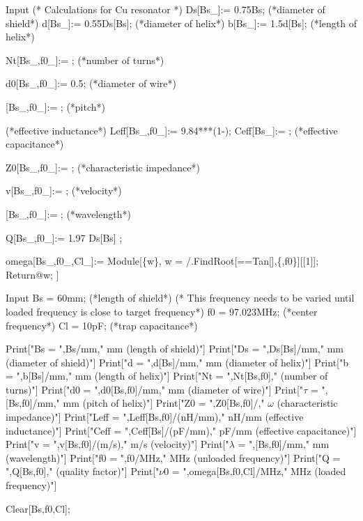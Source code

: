 \begin{mmaCell}[moredefined={Ds, d, b, Nt, d0, Leff, Ceff, Z0, v, Q, omega},morepattern={Bs_, Bs, f0_, f0, Cl_, Cl},morelocal={w}]{Input}
(* Calculations for Cu resonator *)
Ds[Bs_]:= 0.75Bs; (*diameter of shield*)
d[Bs_]:= 0.55Ds[Bs]; (*diameter of helix*)
b[Bs_]:= 1.5d[Bs]; (*length of helix*)

Nt[Bs_,f0_]:= ; (*number of turns*)

d0[Bs_,f0_]:= 0.5; (*diameter of wire*)

\mmaDef{\(\tau\)}[Bs_,f0_]:= ; (*pitch*)

(*effective inductance*)
Leff[Bs_,f0_]:= 9.84***(1-);
Ceff[Bs_]:= ; (*effective capacitance*)
  

Z0[Bs_,f0_]:= ; (*characteristic impedance*)

v[Bs_,f0_]:= ; (*velocity*)
  
\mmaDef{\(\lambda\)}[Bs_,f0_]:= ; (*wavelength*)

Q[Bs_,f0_]:= 1.97 Ds[Bs] ;

omega[Bs_,f0_,Cl_]:= Module[\{w\},
  w = \mmaUnd{\(\nu\)}/.FindRoot[==Tan[],\{\mmaFnc{\(\nu\)},f0\}][[1]];
  Return@w;
]
\end{mmaCell}

\begin{mmaCell}[moredefined={mm, MHz, pF, Ds, d, b, Nt, d0, Z0, Leff, nH, Ceff, v, m, s, Q, omega}]{Input}
Bs = 60mm; (*length of shield*)
(* This frequency needs to be varied 
until loaded frequency is close to target frequency*)
f0 = 97.023MHz; (*center frequency*)
Cl = 10pF; (*trap capacitance*)
  
Print["Bs = ",Bs/mm," mm (length of shield)"]
Print["Ds = ",Ds[Bs]/mm," mm (diameter of shield)"]
Print["d = ",d[Bs]/mm," mm (diameter of helix)"]
Print["b = ",b[Bs]/mm," mm (length of helix)"]
Print["Nt = ",Nt[Bs,f0]," (number of turns)"]
Print["d0 = ",d0[Bs,f0]/mm," mm (diameter of wire)"]
Print["\(\tau\) = ",\mmaDef{\(\tau\)}[Bs,f0]/mm," mm (pitch of helix)"]
Print["Z0 = ",Z0[Bs,f0]/\mmaDef{\(\omega\)}," \(\omega\) (characteristic impedance)"]
Print["Leff = ",Leff[Bs,f0]/(nH/mm)," nH/mm (effective inductance)"]
Print["Ceff = ",Ceff[Bs]/(pF/mm)," pF/mm (effective capacitance)"]
Print["v = ",v[Bs,f0]/(m/s)," m/s (velocity)"]
Print["\(\lambda\) = ",\mmaDef{\(\lambda\)}[Bs,f0]/mm," mm (wavelength)"]
Print["f0 = ",f0/MHz," MHz (unloaded frequency)"]
Print["Q = ",Q[Bs,f0]," (quality factor)"]
Print["\(\nu\)0 = ",omega[Bs,f0,Cl]/MHz," MHz (loaded frequency)"]
  
Clear[Bs,f0,Cl];
\end{mmaCell}

